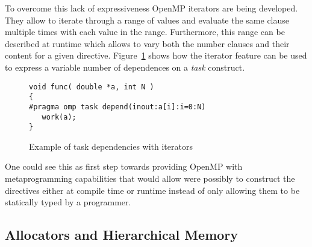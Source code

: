 To overcome this lack of expressiveness OpenMP iterators are being developed.
They allow to iterate through a range of values and evaluate the same clause
multiple times with each value in the range. Furthermore, this range can be
described at runtime which allows to vary both the number clauses and their
content for a given directive. Figure~\ref{fig:iterators} shows how the iterator
feature can be used to express a variable number of dependences on a \emph{task}
construct.

\begin{figure}
\begin{verbatim}
void func( double *a, int N )
{
#pragma omp task depend(inout:a[i]:i=0:N)
   work(a);
}
\end{verbatim}
\caption{Example of task dependencies with iterators}
\label{fig:iterators}
\end{figure}
   
One could see this as first step towards providing OpenMP with metaprogramming
capabilities that would allow were possibly to construct the directives either
at compile time or runtime instead of only allowing them to be statically typed
by a programmer.

\subsection{Allocators and Hierarchical Memory}
\label{sub:allocators_and_hierarchical_memory}



   

